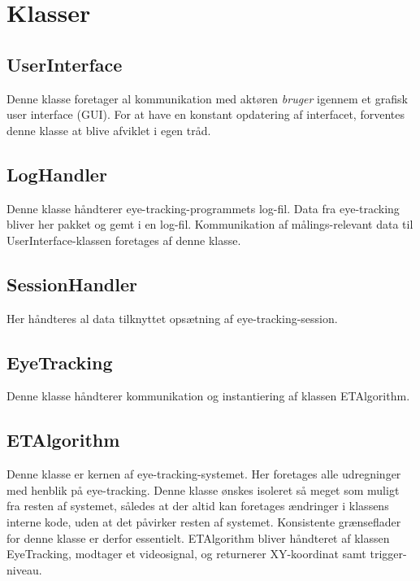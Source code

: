 \documentclass[softwarearkitektur.tex]{subfiles}
\begin{document}
\section{Klasser}
\subsection{UserInterface}
Denne klasse foretager al kommunikation med aktøren \textit{bruger} igennem et grafisk user interface (GUI). For at have en konstant opdatering af interfacet, forventes denne klasse at blive afviklet i egen tråd. 

\subsection{LogHandler}
Denne klasse håndterer eye-tracking-programmets log-fil. Data fra eye-tracking bliver her pakket og gemt i en log-fil. Kommunikation af målings-relevant data til UserInterface-klassen foretages af denne klasse.

\subsection{SessionHandler}
Her håndteres al data tilknyttet opsætning af eye-tracking-session. 

\subsection{EyeTracking}
Denne klasse håndterer kommunikation og instantiering af klassen ETAlgorithm. 

\subsection{ETAlgorithm}
Denne klasse er kernen af eye-tracking-systemet. Her foretages alle udregninger med henblik på eye-tracking. Denne klasse ønskes isoleret så meget som muligt fra resten af systemet, således at der altid kan foretages ændringer i klassens interne kode, uden at det påvirker resten af systemet. Konsistente grænseflader for denne klasse er derfor essentielt. 
ETAlgorithm bliver håndteret af klassen EyeTracking, modtager et videosignal, og returnerer XY-koordinat samt trigger-niveau. 
\end{document}
